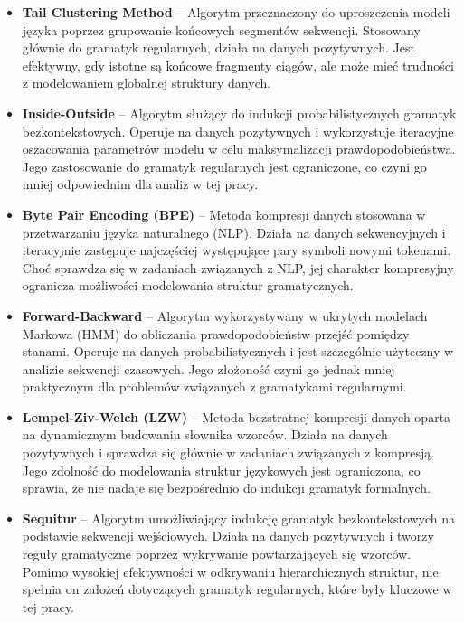 \begin{itemize}  
    \item \textbf{Tail Clustering Method} – Algorytm przeznaczony do uproszczenia modeli języka poprzez grupowanie końcowych segmentów sekwencji. Stosowany głównie do gramatyk regularnych, działa na danych pozytywnych. Jest efektywny, gdy istotne są końcowe fragmenty ciągów, ale może mieć trudności z modelowaniem globalnej struktury danych.  

    \item \textbf{Inside-Outside} – Algorytm służący do indukcji probabilistycznych gramatyk bezkontekstowych. Operuje na danych pozytywnych i wykorzystuje iteracyjne oszacowania parametrów modelu w celu maksymalizacji prawdopodobieństwa. Jego zastosowanie do gramatyk regularnych jest ograniczone, co czyni go mniej odpowiednim dla analiz w tej pracy.  

    \item \textbf{Byte Pair Encoding (BPE)} – Metoda kompresji danych stosowana w przetwarzaniu języka naturalnego (NLP). Działa na danych sekwencyjnych i iteracyjnie zastępuje najczęściej występujące pary symboli nowymi tokenami. Choć sprawdza się w zadaniach związanych z NLP, jej charakter kompresyjny ogranicza możliwości modelowania struktur gramatycznych.  

    \item \textbf{Forward-Backward} – Algorytm wykorzystywany w ukrytych modelach Markowa (HMM) do obliczania prawdopodobieństw przejść pomiędzy stanami. Operuje na danych probabilistycznych i jest szczególnie użyteczny w analizie sekwencji czasowych. Jego złożoność czyni go jednak mniej praktycznym dla problemów związanych z gramatykami regularnymi.  

    \item \textbf{Lempel-Ziv-Welch (LZW)} – Metoda bezstratnej kompresji danych oparta na dynamicznym budowaniu słownika wzorców. Działa na danych pozytywnych i sprawdza się głównie w zadaniach związanych z kompresją. Jego zdolność do modelowania struktur językowych jest ograniczona, co sprawia, że nie nadaje się bezpośrednio do indukcji gramatyk formalnych.  

    \item \textbf{Sequitur} – Algorytm umożliwiający indukcję gramatyk bezkontekstowych na podstawie sekwencji wejściowych. Działa na danych pozytywnych i tworzy reguły gramatyczne poprzez wykrywanie powtarzających się wzorców. Pomimo wysokiej efektywności w odkrywaniu hierarchicznych struktur, nie spełnia on założeń dotyczących gramatyk regularnych, które były kluczowe w tej pracy.  
\end{itemize}  
 


